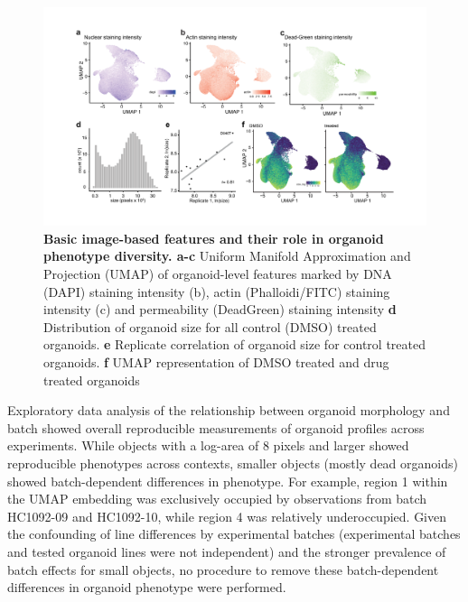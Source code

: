 \begin{flushleft}
\begin{figure}[h]
\centering
\includegraphics[width=\textwidth,
                height=\textheight,
                keepaspectratio]{figures/pdf/fig_145.pdf}
\caption{\textbf{Basic image-based features and their role in organoid phenotype diversity. a-c} Uniform Manifold Approximation and Projection (UMAP) of organoid-level features marked by DNA (DAPI) staining intensity (b), actin (Phalloidi/FITC) staining intensity (c) and permeability (DeadGreen) staining intensity \textbf{d} Distribution of organoid size for all control (DMSO) treated organoids. \textbf{e} Replicate correlation of organoid size for control treated organoids. \textbf{f} UMAP representation of DMSO treated and drug treated organoids}
\label{fig_145}
\end{figure}
\bigbreak

Exploratory data analysis of the relationship between organoid morphology and batch showed overall reproducible measurements of organoid profiles across experiments. While objects with a log-area of 8 pixels and larger showed reproducible phenotypes across contexts, smaller objects (mostly dead organoids) showed batch-dependent differences in phenotype. For example, region 1 within the UMAP embedding was exclusively occupied by observations from batch HC1092-09 and HC1092-10, while region 4 was relatively underoccupied. Given the confounding of line differences by experimental batches (experimental batches and tested organoid lines were not independent) and the stronger prevalence of batch effects for small objects, no procedure to remove these batch-dependent differences in organoid phenotype were performed. 

\bigbreak


\end{flushleft}
